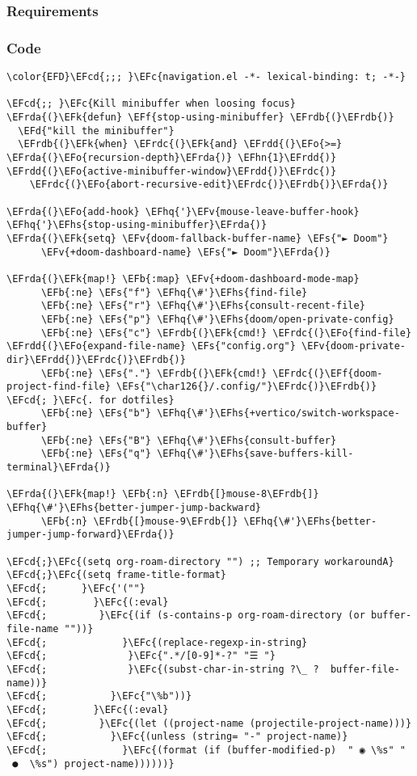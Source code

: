 \documentclass[a4wide,10pt]{article}
\newcommand{\EFc}[1]{\textcolor{EFc}{#1}} %
\newcommand{\EFcd}[1]{\textcolor{EFcd}{#1}} %
\newcommand{\EFs}[1]{\textcolor{EFs}{#1}} %
\newcommand{\EFd}[1]{\textcolor{EFd}{#1}} %
\newcommand{\EFk}[1]{\textcolor{EFk}{#1}} %
\newcommand{\EFb}[1]{\textcolor{EFb}{#1}} %
\newcommand{\EFf}[1]{\textcolor{EFf}{#1}} %
\newcommand{\EFv}[1]{\textcolor{EFv}{#1}} %
\newcommand{\EFo}[1]{\textcolor{EFo}{#1}} %
\newcommand{\EFhn}[1]{\textcolor{EFhn}{\textbf{#1}}} %
\newcommand{\EFhq}[1]{\textcolor{EFhq}{#1}} %
\newcommand{\EFhs}[1]{\textcolor{EFhs}{#1}} %
\newcommand{\EFrda}[1]{\textcolor{EFrda}{#1}} %
\newcommand{\EFrdb}[1]{\textcolor{EFrdb}{#1}} %
\newcommand{\EFrdc}[1]{\textcolor{EFrdc}{#1}} %
\newcommand{\EFrdd}[1]{\textcolor{EFrdd}{#1}} %
\begin{document}
\subsubsection{Requirements}
\label{sec:org8344a2d}
\subsubsection{Code}
\label{sec:orgd568048}
\begin{Code}
\begin{Verbatim}
\color{EFD}\EFcd{;;; }\EFc{navigation.el -*- lexical-binding: t; -*-}

\EFcd{;; }\EFc{Kill minibuffer when loosing focus}
\EFrda{(}\EFk{defun} \EFf{stop-using-minibuffer} \EFrdb{(}\EFrdb{)}
  \EFd{"kill the minibuffer"}
  \EFrdb{(}\EFk{when} \EFrdc{(}\EFk{and} \EFrdd{(}\EFo{>=} \EFrda{(}\EFo{recursion-depth}\EFrda{)} \EFhn{1}\EFrdd{)} \EFrdd{(}\EFo{active-minibuffer-window}\EFrdd{)}\EFrdc{)}
    \EFrdc{(}\EFo{abort-recursive-edit}\EFrdc{)}\EFrdb{)}\EFrda{)}

\EFrda{(}\EFo{add-hook} \EFhq{'}\EFv{mouse-leave-buffer-hook} \EFhq{'}\EFhs{stop-using-minibuffer}\EFrda{)}
\EFrda{(}\EFk{setq} \EFv{doom-fallback-buffer-name} \EFs{"► Doom"}
      \EFv{+doom-dashboard-name} \EFs{"► Doom"}\EFrda{)}

\EFrda{(}\EFk{map!} \EFb{:map} \EFv{+doom-dashboard-mode-map}
      \EFb{:ne} \EFs{"f"} \EFhq{\#'}\EFhs{find-file}
      \EFb{:ne} \EFs{"r"} \EFhq{\#'}\EFhs{consult-recent-file}
      \EFb{:ne} \EFs{"p"} \EFhq{\#'}\EFhs{doom/open-private-config}
      \EFb{:ne} \EFs{"c"} \EFrdb{(}\EFk{cmd!} \EFrdc{(}\EFo{find-file} \EFrdd{(}\EFo{expand-file-name} \EFs{"config.org"} \EFv{doom-private-dir}\EFrdd{)}\EFrdc{)}\EFrdb{)}
      \EFb{:ne} \EFs{"."} \EFrdb{(}\EFk{cmd!} \EFrdc{(}\EFf{doom-project-find-file} \EFs{"\char126{}/.config/"}\EFrdc{)}\EFrdb{)} \EFcd{; }\EFc{. for dotfiles}
      \EFb{:ne} \EFs{"b"} \EFhq{\#'}\EFhs{+vertico/switch-workspace-buffer}
      \EFb{:ne} \EFs{"B"} \EFhq{\#'}\EFhs{consult-buffer}
      \EFb{:ne} \EFs{"q"} \EFhq{\#'}\EFhs{save-buffers-kill-terminal}\EFrda{)}

\EFrda{(}\EFk{map!} \EFb{:n} \EFrdb{[}mouse-8\EFrdb{]} \EFhq{\#'}\EFhs{better-jumper-jump-backward}
      \EFb{:n} \EFrdb{[}mouse-9\EFrdb{]} \EFhq{\#'}\EFhs{better-jumper-jump-forward}\EFrda{)}

\EFcd{;}\EFc{(setq org-roam-directory "") ;; Temporary workaroundA}
\EFcd{;}\EFc{(setq frame-title-format}
\EFcd{;      }\EFc{'(""}
\EFcd{;        }\EFc{(:eval}
\EFcd{;         }\EFc{(if (s-contains-p org-roam-directory (or buffer-file-name ""))}
\EFcd{;             }\EFc{(replace-regexp-in-string}
\EFcd{;              }\EFc{".*/[0-9]*-?" "☰ "}
\EFcd{;              }\EFc{(subst-char-in-string ?\_ ?  buffer-file-name))}
\EFcd{;           }\EFc{"\%b"))}
\EFcd{;        }\EFc{(:eval}
\EFcd{;         }\EFc{(let ((project-name (projectile-project-name)))}
\EFcd{;           }\EFc{(unless (string= "-" project-name)}
\EFcd{;             }\EFc{(format (if (buffer-modified-p)  " ◉ \%s" "  ●  \%s") project-name))))))}


\end{Verbatim}
\end{Code}
\end{document}
